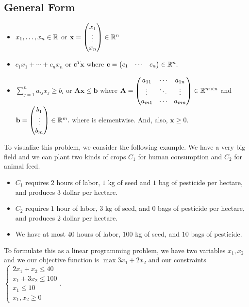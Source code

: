 \documentclass[a4paper,12pt]{article}
\begin{document}
\subsection{General Form}
\begin{itemize}
    \item {} $x_1,\dots,x_n\in\mathbb{R}$ or $\mathbf x=\begin{pmatrix}
    x_1\\
    \vdots\\
    x_n
    \end{pmatrix}\in\mathbb{R}^n$
    \item {} $c_1x_1+\cdots+c_nx_n$ or $\mathbf c^T\mathbf x$ where $\mathbf c=\begin{pmatrix}
    c_1&\cdots&c_n
    \end{pmatrix}\in\mathbb{R}^n.$
    \item {} $\sum_{j=1}^na_{ij}x_j\geq b_i$ or $\mathbf A\mathbf x\leq\mathbf b$ where $\mathbf A=\begin{pmatrix}
    a_{11}&\cdots&a_{1n}\\
    \vdots&\ddots&\vdots\\
    a_{m1}&\cdots&a_{mn}
    \end{pmatrix}\in\mathbb{R}^{m\times n}$ and $\mathbf b=\begin{pmatrix}
    b_1\\
    \vdots\\
    b_m
    \end{pmatrix}\in\mathbb{R}^m.$
    where is elementwise. And, also, $\mathbf x\geq0.$
\end{itemize}
To visualize this problem, we consider the following example. We have a very big field and we can plant two kinds of crops $C_1$ for human consumption and $C_2$ for animal feed. \begin{itemize}
    \item $C_1$ requires $2$ hours of labor, $1$ kg of seed and $1$ bag of pesticide per hectare, and produces $3$ dollar per hectare.
    \item $C_2$ requires $1$ hour of labor, $3$ kg of seed, and $0$ bags of pesticide per hectare, and produces $2$ dollar per hectare.
    \item We have at most $40$ hours of labor, $100$ kg of seed, and $10$ bags of pesticide.
\end{itemize}
To formulate this as a linear programming problem, we have two variables $x_1,x_2$ and we our objective function is $\max{3x_1+2x_2}$ and our constraints $\begin{cases}
    2x_1+x_2\leq 40\\
    x_1+3x_2\leq 100\\
    x_1\leq 10\\
    x_1,x_2\geq 0
    \end{cases}.$
\end{document}
